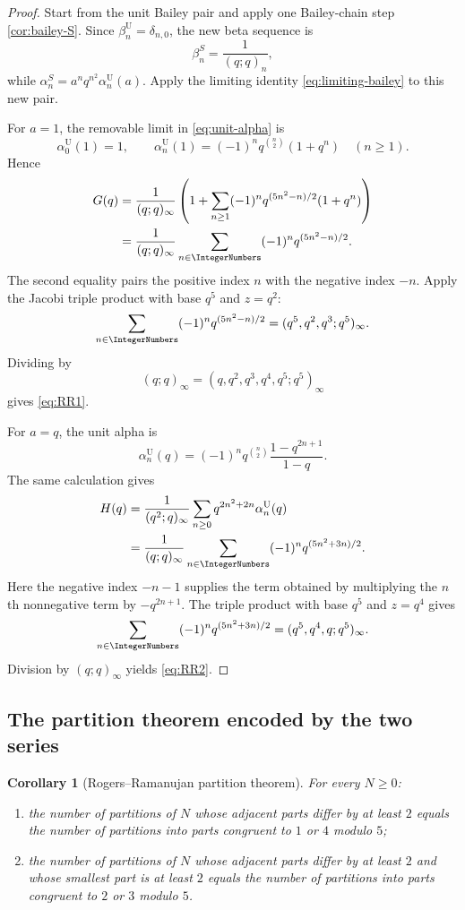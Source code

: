 \documentclass[11pt]{article}
\theoremstyle{blueplain}
\newtheorem{corollary}[theorem]{Corollary}
\theoremstyle{bluedef}
\begin{document}
\begin{proof}
Start from the unit Bailey pair and apply one Bailey-chain step \cref{cor:bailey-S}.  Since $\beta_n^{\mathrm U}=\delta_{n,0}$, the new beta sequence is
\begin{equation}\label{eq:unit-after-S-beta}
\beta_n^S=\frac1{(q;q)_n},
\end{equation}
while $\alpha_n^S=a^nq^{n^2}\alpha_n^{\mathrm U}(a)$.  Apply the limiting identity \eqref{eq:limiting-bailey} to this new pair.

For $a=1$, the removable limit in \eqref{eq:unit-alpha} is
\[
\alpha_0^{\mathrm U}(1)=1,
\qquad
\alpha_n^{\mathrm U}(1)=(-1)^nq^{\binom n2}(1+q^n)
\quad(n\ge1).
\]
Hence
\begin{align*}
G(q)
&=\frac1{(q;q)_\infty}
\left(1+\sum_{n\ge1}(-1)^n
q^{(5n^2-n)/2}(1+q^n)\right)\\
&=\frac1{(q;q)_\infty}
\sum_{n\in\IntegerNumbers}(-1)^nq^{(5n^2-n)/2}.
\end{align*}
The second equality pairs the positive index $n$ with the negative index $-n$.  Apply the Jacobi triple product with base $q^5$ and $z=q^2$:
\[
\sum_{n\in\IntegerNumbers}(-1)^nq^{(5n^2-n)/2}
=(q^5,q^2,q^3;q^5)_\infty.
\]
Dividing by
\[
(q;q)_\infty=(q,q^2,q^3,q^4,q^5;q^5)_\infty
\]
gives \eqref{eq:RR1}.

For $a=q$, the unit alpha is
\[
\alpha_n^{\mathrm U}(q)=(-1)^nq^{\binom n2}
\frac{1-q^{2n+1}}{1-q}.
\]
The same calculation gives
\begin{align*}
H(q)
&=\frac1{(q^2;q)_\infty}
\sum_{n\ge0}q^{2n^2+2n}\alpha_n^{\mathrm U}(q)\\
&=\frac1{(q;q)_\infty}
\sum_{n\in\IntegerNumbers}(-1)^nq^{(5n^2+3n)/2}.
\end{align*}
Here the negative index $-n-1$ supplies the term obtained by multiplying the $n$th nonnegative term by $-q^{2n+1}$.  The triple product with base $q^5$ and $z=q^4$ gives
\[
\sum_{n\in\IntegerNumbers}(-1)^nq^{(5n^2+3n)/2}
=(q^5,q^4,q;q^5)_\infty.
\]
Division by $(q;q)_\infty$ yields \eqref{eq:RR2}.
\end{proof}

\subsection{The partition theorem encoded by the two series}

\begin{corollary}[Rogers--Ramanujan partition theorem]\label{cor:RR-partitions}
For every $N\ge0$:
\begin{enumerate}[label=(\roman*)]
\item the number of partitions of $N$ whose adjacent parts differ by at least $2$ equals the number of partitions into parts congruent to $1$ or $4$ modulo $5$;
\item the number of partitions of $N$ whose adjacent parts differ by at least $2$ and whose smallest part is at least $2$ equals the number of partitions into parts congruent to $2$ or $3$ modulo $5$.
\end{enumerate}
\end{corollary}
\end{document}
